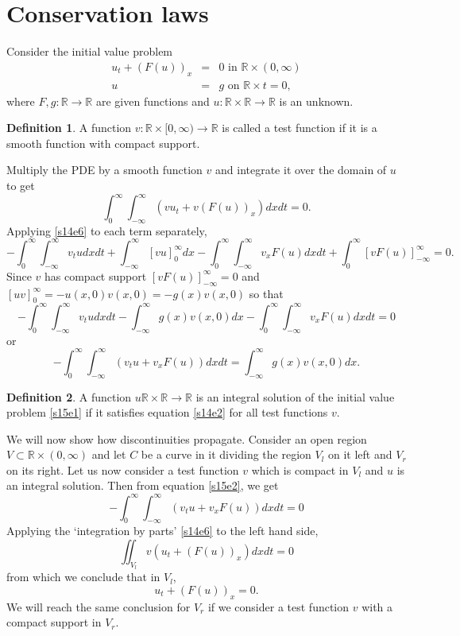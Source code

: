 \documentclass{article}
\theoremstyle{plain}
\numberwithin{thm}{section}
\theoremstyle{plain}
\numberwithin{prop}{section}
\theoremstyle{definition}
\newtheorem{defn}{Definition}
\numberwithin{defn}{section}
\theoremstyle{remark}
\numberwithin{equation}{section}
\begin{document}
\section{Conservation laws}\label{s15}
Consider the initial value problem
\begin{eqnarray}
u_t + (F(u))_x &=& 0 \text{ in } \mathbb{R} \times (0, \infty) \label{s15e1} \\
u &=& g \text{ on } \mathbb{R} \times {t=0} \nonumber,
\end{eqnarray}
where $F, g: \mathbb{R} \rightarrow \mathbb{R}$ are given functions and $u:\mathbb{R} \times 
\mathbb{R} \rightarrow \mathbb{R}$ is an unknown. 

\begin{defn}\label{s15d1}
A function $v: \mathbb{R} \times [0, \infty) \rightarrow \mathbb{R}$ is called a test function if it
is a smooth function with compact support.
\end{defn}
Multiply the PDE by a smooth function $v$ and integrate it over the domain
of $u$ to get
\[
\int_0^\infty \int_{-\infty}^\infty \left(vu_t + v(F(u))_x\right)dxdt = 0.
\]
Applying \eqref{s14e6} to each term separately,
\[
-\int_0^\infty \int_{-\infty}^\infty v_t u dxdt + \int_{-\infty}^\infty \left[vu\right]_0^\infty dx
-\int_0^\infty \int_{-\infty}^\infty v_x F(u) dxdt + 
\int_0^\infty \left[vF(u)\right]_{-\infty}^\infty = 0.
\]
Since $v$ has compact support $[vF(u)]_{-\infty}^\infty = 0$ and $[uv]_0^\infty = -u(x, 0)v(x, 0)
= -g(x)v(x, 0)$ so that
\[
-\int_0^\infty \int_{-\infty}^\infty v_t u dxdt - \int_{-\infty}^\infty  g(x)v(x, 0) dx - 
\int_0^\infty \int_{-\infty}^\infty v_x F(u) dxdt = 0
\]
or
\begin{equation}\label{s15e2}
-\int_0^\infty \int_{-\infty}^\infty \left(v_t u + v_x F(u)\right)dxdt = 
\int_{-\infty}^\infty  g(x)v(x, 0) dx.
\end{equation}
\begin{defn}\label{s15d2}
A function $u\mathbb{R} \times \mathbb{R} \rightarrow \mathbb{R}$ is an integral solution of the
initial value problem \eqref{s15e1} if it satisfies equation \eqref{s14e2} for all test functions 
$v$.
\end{defn}

We will now show how discontinuities propagate. Consider an open region $V \subset \mathbb{R} 
\times (0, \infty)$ and let $C$ be a curve in it dividing the region $V_l$ on it left and $V_r$
on its right. Let us now consider a test function $v$ which is compact in $V_l$ and $u$ is an
integral solution. Then from equation \eqref{s15e2}, we get
\[
-\int_0^\infty \int_{-\infty}^\infty \left(v_t u + v_x F(u)\right)dxdt = 0
\]
Applying the `integration by parts' \eqref{s14e6} to the left hand side,
\begin{equation}\label{s15e3}
\iint_{V_l}v\left(u_t + (F(u))_x\right)dxdt = 0
\end{equation}
from which we conclude that in $V_l$,
\begin{equation}\label{s15e4}
u_t + (F(u))_x = 0.
\end{equation}
We will reach the same conclusion for $V_r$ if we consider a test function $v$ with a compact
support in $V_r$. 
\end{document}
